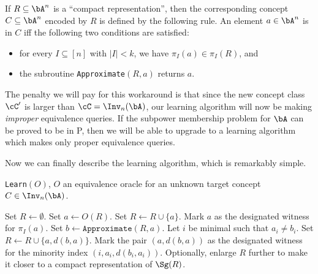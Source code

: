 \begin{defn} If $R \subseteq \bA^n$ is a ``compact representation'', then the corresponding concept $C \subseteq \bA^n$ encoded by $R$ is defined by the following rule. An element $a \in \bA^n$ is in $C$ iff the following two conditions are satisfied:
\begin{itemize}
\item for every $I \subseteq [n]$ with $|I| < k$, we have $\pi_I(a) \in \pi_I(R)$, and

\item the subroutine \texttt{Approximate}$(R,a)$ returns $a$.
\end{itemize}
\end{defn}

The penalty we will pay for this workaround is that since the new concept class $\cC'$ is larger than $\cC = \Inv_n(\bA)$, our learning algorithm will now be making \emph{improper} equivalence queries. If the subpower membership problem for $\bA$ can be proved to be in P, then we will be able to upgrade to a learning algorithm which makes only proper equivalence queries.

Now we can finally describe the learning algorithm, which is remarkably simple.

\begin{algorithm}
\caption{\texttt{Learn}$(O)$, $O$ an equivalence oracle for an unknown target concept $C \in \Inv_n(\bA)$.}
\begin{algorithmic}[1]
\State Set $R \gets \emptyset$.
\State Set $a \gets O(R)$.
\State Set $R \gets R\cup\{a\}$.
\State Mark $a$ as the designated witness for $\pi_I(a)$.
\EndFor
{}
\State Set $b \gets \texttt{Approximate}(R,a)$.
\State Let $i$ be minimal such that $a_i \ne b_i$.
\State Set $R \gets R\cup\{a,d(b,a)\}$.
\State Mark the pair $(a,d(b,a))$ as the designated witness for the minority index $(i,a_i,d(b_i,a_i))$.
\EndWhile
\State Optionally, enlarge $R$ further to make it closer to a compact representation of $\Sg(R)$.
\EndWhile
\end{algorithmic}
\end{algorithm}

